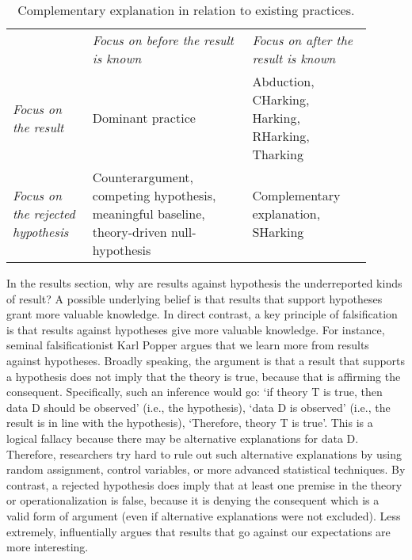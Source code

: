 \documentclass[authordate, meta,issue]{jote-new-article}
\begin{document}
\begin{table}[t]

  \begin{fullwidth}
    \caption{Complementary explanation in relation to existing practices.
    }
    \label{tab:2}
    \begin{tabularx}{\columnwidth}{@{}>{\RaggedRight\arraybackslash}p{0.2\linewidth} >{\RaggedRight\arraybackslash}p{0.40\linewidth} >{\RaggedRight\arraybackslash}p{0.30\linewidth}@{}}

                                              & \emph{Focus on before the result is known}                                                & \emph{Focus on after the result is known}        \\
      \emph{Focus on the result}              & Dominant practice                                                                         & Abduction, CHarking, Harking, RHarking, Tharking \\
      \emph{Focus on the rejected hypothesis} & Counterargument, competing hypothesis, meaningful baseline, theory-driven null-hypothesis & Complementary explanation, SHarking              \\
    \end{tabularx}
  \end{fullwidth}
\end{table}


In the results section, why are results against hypothesis the underreported kinds of result? A possible underlying belief is that results that support hypotheses grant more valuable knowledge. In direct contrast, a key principle of falsification is that results against hypotheses give more valuable knowledge. For instance, seminal falsificationist Karl Popper argues that we learn more from results against hypotheses. Broadly speaking, the argument is that a result that supports a hypothesis does not imply that the theory is true, because that is affirming the consequent. Specifically, such an inference would go: ‘if theory T is true, then data D should be observed' (i.e., the hypothesis), ‘data D is observed' (i.e., the result is in line with the hypothesis), ‘Therefore, theory T is true'. This is a logical fallacy because there may be alternative explanations for data D. Therefore, researchers try hard to rule out such alternative explanations by using random assignment, control variables, or more advanced statistical techniques. By contrast, a rejected hypothesis does imply that at least one premise in the theory or operationalization is false, because it is denying the consequent which is a valid form of argument (even if alternative explanations were not excluded). Less extremely, \parencite{Davis1971}  influentially argues that results that go against our expectations are more interesting.
\end{document}
